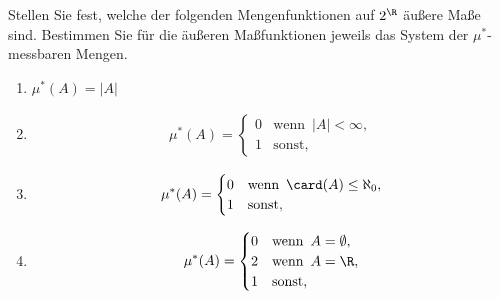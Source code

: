 
\begin{exercise}

Stellen Sie fest, welche der folgenden Mengenfunktionen auf $2^\R$ äußere Maße sind. Bestimmen Sie für die äußeren Maßfunktionen jeweils das System der $\mu^\ast$-messbaren Mengen.

\begin{enumerate}[label = (\alph*)]

  \item
  $\mu^\ast(A) = |A|$
  
  \item

  \begin{align*}
    \mu^\ast(A) =
    \begin{cases}
      0 & \text{wenn} \enspace |A| < \infty, \\
      1 & \text{sonst},
    \end{cases}
  \end{align*}

  \item

  \begin{align*}
    \mu^\ast(A) =
    \begin{cases}
      0 & \text{wenn} \enspace \card(A) \leq \aleph_0, \\
      1 & \text{sonst},
    \end{cases}
  \end{align*}

  \item

  \begin{align*}
    \mu^\ast(A) =
    \begin{cases}
      0 & \text{wenn} \enspace A = \emptyset, \\
      2 & \text{wenn} \enspace A = \R, \\
      1 & \text{sonst},
    \end{cases}
  \end{align*}

\end{enumerate}

\end{exercise}


